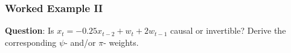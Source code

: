 \documentclass[%
xcolor=pdftex]{beamer}
\begin{document}
\begin{frame}
\frametitle{Worked Example II}

\textbf{Question}: Is $x_t = -0.25x_{t-2} + w_t + 2 w_{t-1}$ causal or invertible? Derive the corresponding $\psi$- and/or $\pi$- weights.

\vspace{50mm}



\end{frame}






\end{document}
